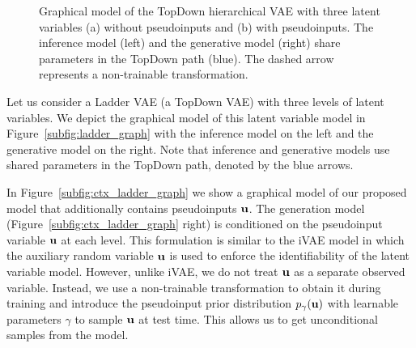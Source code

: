 \begin{figure}[t]
{}
    \caption{Graphical model of the TopDown hierarchical VAE with three latent variables (a) without pseudoinputs and (b) with pseudoinputs. The inference model (left) and the generative model (right) share parameters in the TopDown path (blue). The dashed arrow represents a non-trainable transformation.}
    \label{fig:dct_vae_graph_model}
\vskip 10pt
\end{figure}

Let us consider a Ladder VAE (a TopDown VAE) with three levels of latent variables. We depict the graphical model of this latent variable model in Figure~\ref{subfig:ladder_graph} with the inference model on the left and the generative model on the right. Note that inference and generative models use shared parameters in the TopDown path, denoted by the blue arrows. 

In Figure~\ref{subfig:ctx_ladder_graph} we show a graphical model of our proposed model that additionally contains pseudoinputs ${\mathbf{u}}$.
The generation model (Figure~\ref{subfig:ctx_ladder_graph} right) is conditioned on the pseudoinput variable ${\mathbf{u}}$ at each level. 
This formulation is similar to the iVAE model \citep{khemakhem2020variational} in which the auxiliary random variable ${\mathbf{u}} $ is used to enforce the identifiability of the latent variable model. 
However, unlike iVAE, we do not treat ${\mathbf{u}}$ as a separate observed variable. Instead, we use a non-trainable transformation to obtain it during training and introduce the pseudoinput prior distribution $p_{\gamma}({\mathbf{u}})$ with learnable parameters $\gamma$ to sample ${\mathbf{u}}$ at test time. 
This allows us to get unconditional samples from the model.

